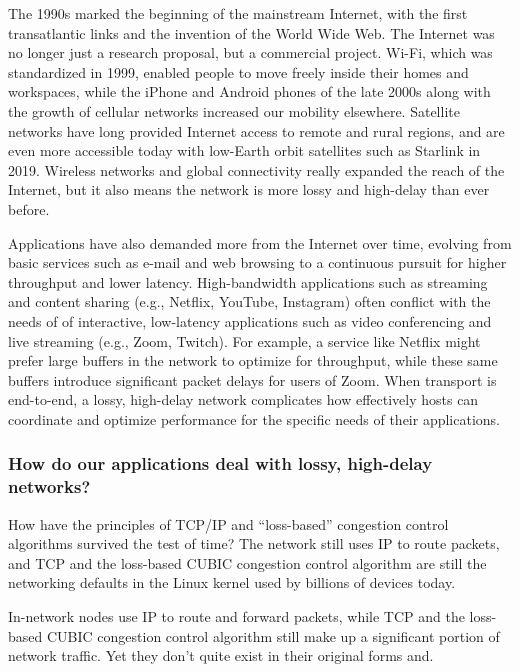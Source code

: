 The 1990s marked the beginning of the mainstream Internet, with the first
transatlantic links and the invention of the World Wide Web. The Internet was
no longer just a research proposal, but a commercial project. Wi-Fi, which was
standardized in 1999, enabled people to move freely inside their homes and
workspaces, while the iPhone and Android phones of the late 2000s along with
the growth of cellular networks increased our mobility elsewhere. Satellite
networks have long provided Internet access to remote and rural regions, and
are even more accessible today with low-Earth orbit satellites such as Starlink
in 2019. Wireless networks and global connectivity really expanded the reach of
the Internet, but it also means the network is more lossy and high-delay than
ever before.

Applications have also demanded more from the Internet over time, evolving from
basic services such as e-mail and web browsing to a continuous pursuit for
higher throughput and lower latency. High-bandwidth applications such as
streaming and content sharing (e.g., Netflix, YouTube, Instagram) often
conflict with the needs of of interactive, low-latency applications such as
video conferencing and live streaming (e.g., Zoom, Twitch). For example, a
service like Netflix might prefer large buffers in the network to optimize for
throughput, while these same buffers introduce significant packet delays for
users of Zoom. When transport is end-to-end, a lossy, high-delay network
complicates how effectively hosts can coordinate and optimize performance for
the specific needs of their applications.

\subsubsection{How do our applications deal with lossy, high-delay networks?}

How have the principles of TCP/IP and ``loss-based'' congestion control
algorithms survived the test of time? The network still uses IP to route
packets, and TCP and the loss-based CUBIC congestion control algorithm are
still the networking defaults in the Linux kernel used by billions of devices
today.

In-network nodes use IP to route and forward
packets, while TCP and the loss-based CUBIC congestion control algorithm still
make up a significant portion of network traffic. Yet they don't quite exist
in their original forms and.


